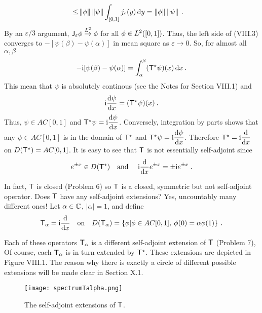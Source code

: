 \begin{example}
\begin{align}
     \leq&
      \left \Vert \phi \right \Vert \left \Vert \psi \right \Vert \int_{[0,1]} j_\varepsilon(y) \, \mathrm{d} y 
     =
      \left \Vert \phi \right \Vert \left \Vert \psi \right \Vert \:.
\end{align}
By an $\varepsilon/3$ argument, $\mathsf{J}_\varepsilon \phi \overset{L^2}\rightarrow \phi$ for all $\phi \in L^{2}([0,1])$.
Thus, the left side of (VIII.3)
converges to $-[\psi(\beta) - \psi(\alpha)]$ in mean square as $\varepsilon \rightarrow 0$. So, for almost all $\alpha, \beta$ \begin{align}
    -\mathrm{i}[\psi(\beta) - \psi(\alpha)] = \int_\alpha^\beta (\mathsf{T}^\star \psi)(x) \, \mathrm{d} x \:.
\end{align}
This mean that $\psi$ is absolutely continous (see the Notes for Section VIII.1) and \begin{align}
    \mathrm{i} \dfrac{\mathrm{d}\psi}{\mathrm{d}x} = (\mathsf{T}^\star \psi)(x) \:.
\end{align}
Thus, $\psi \in AC[0,1]$ and $\mathsf{T}^\star \psi = \mathrm{i} \dfrac{\mathrm{d}\psi}{\mathrm{d}x} $. Conversely, integration by parts
shows that any $\psi \in AC[0,1]$ is in the domain of $\mathsf{T}^\star$ and $\mathsf{T}^\star \psi = \mathrm{i} \dfrac{\mathrm{d}\psi}{\mathrm{d}x}$. Therefore $\mathsf{T}^\star = \mathrm{i} \dfrac{\mathrm{d}}{\mathrm{d}x}$ on $D(\mathsf{T}^\star) = AC[0,1]$.
It is easy to see that $\mathsf{T}$ is not essentially self-adjoint since \begin{align}
    e^{\pm x} \in D(\mathsf{T}^\star) \quad \text{and } \quad \mathrm{i} \dfrac{\mathrm{d}}{\mathrm{d}x} e^{\pm x} = \pm \mathrm{i} e^{\pm x} \:.
\end{align}

In fact, $\mathsf{T}$ is closed (Problem 6) so $\mathsf{T}$ is a closed, symmetric but not self-adjoint operator.
Does $\mathsf{T}$ have any self-adjoint extensions? Yes, uncountably many different ones! Let $\alpha \in \mathbb{C}$, $|\alpha| = 1$, and define
\begin{align}
    \mathsf{T}_\alpha = \mathrm{i} \dfrac{\mathrm{d}}{\mathrm{d}x} \quad \text{on} \quad D(\mathsf{T}_\alpha) = \left \lbrace \phi | \phi \in AC[0,1] , \: \phi(0) = \alpha \phi(1) \right \rbrace \:.
\end{align}

Each of these operators $\mathsf{T}_\alpha$ is a different self-adjoint extension of $\mathsf{T}$ (Problem 7),
Of course, each $\mathsf{T}_\alpha$ is in turn extended by $\mathsf{T}^\star$. These extensions are depicted in Figure VIII.1. The reason why there is exactly a circle of different possible extensions will be made clear in Section X.1.

\begin{figure}[H]
    \centering
    \texttt{[image: spectrumTalpha.png]}
    \caption{The self-adjoint extensions of $\mathsf{T}$.}
\end{figure}

\end{example}